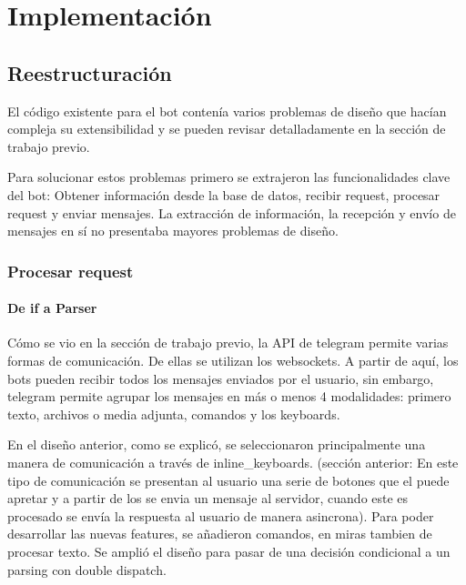 \chapter{Implementación}

\section{Reestructuración}

    El código existente para el bot contenía varios problemas de diseño que hacían compleja su extensibilidad y se pueden revisar detalladamente en la sección de trabajo previo.

    \par Para solucionar estos problemas primero se extrajeron las funcionalidades clave del bot: Obtener información desde la base de datos, recibir request, procesar request y enviar mensajes. La extracción de información, la recepción y envío de mensajes en sí no presentaba mayores problemas de diseño. 

    \subsection{Procesar request}

    \subsubsection{De if a Parser}
    
        \par Cómo se vio en la sección de trabajo previo, la API de telegram permite varias formas de comunicación. De ellas se utilizan los websockets. A partir de aquí, los bots pueden recibir todos los mensajes enviados por el usuario, sin embargo, telegram permite agrupar los mensajes en más o menos 4 modalidades: primero texto, archivos o media adjunta, comandos y los keyboards.

        \par En el diseño anterior, como se explicó, se seleccionaron principalmente una manera de comunicación  a través de inline\_keyboards. (sección anterior: En este tipo de comunicación se presentan al usuario una serie de botones que el puede apretar y a partir de los se envia un mensaje al servidor, cuando este es procesado se envía la respuesta al usuario de manera asincrona). Para poder desarrollar las nuevas features, se añadieron comandos, en miras tambien de procesar texto. Se amplió el diseño para pasar de una decisión condicional a un parsing con double dispatch.

